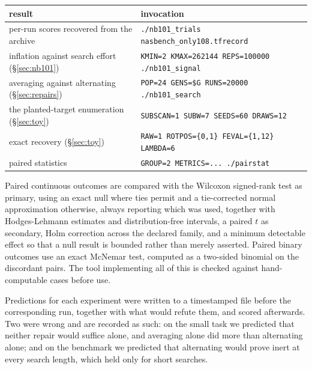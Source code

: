 \documentclass[11pt]{article}
\begin{document}
\begin{center}
\begin{tabular}{ll}
\toprule
result & invocation \\
\midrule
per-run scores recovered from the archive & \texttt{./nb101\_trials nasbench\_only108.tfrecord} \\
inflation against search effort (\S\ref{sec:nb101}) & \texttt{KMIN=2 KMAX=262144 REPS=100000 ./nb101\_signal} \\
averaging against alternating (\S\ref{sec:repairs}) & \texttt{POP=24 GENS=\$G RUNS=20000 ./nb101\_search} \\
the planted-target enumeration (\S\ref{sec:toy}) & \texttt{SUBSCAN=1 SUBW=7 SEEDS=60 DRAWS=12} \\
exact recovery (\S\ref{sec:toy}) & \texttt{RAW=1 ROTPOS=\{0,1\} FEVAL=\{1,12\} LAMBDA=6} \\
paired statistics & \texttt{GROUP=2 METRICS=... ./pairstat} \\
\bottomrule
\end{tabular}
\end{center}

Paired continuous outcomes are compared with the Wilcoxon signed-rank test as primary, using an exact
null where ties permit and a tie-corrected normal approximation otherwise, always reporting which was
used, together with Hodges-Lehmann estimates and distribution-free intervals, a paired $t$ as secondary,
Holm correction across the declared family, and a minimum detectable effect so that a null result is
bounded rather than merely asserted. Paired binary outcomes use an exact McNemar test, computed as a
two-sided binomial on the discordant pairs. The tool implementing all of this is checked against
hand-computable cases before use.

Predictions for each experiment were written to a timestamped file before the corresponding run,
together with what would refute them, and scored afterwards. Two were wrong and are recorded as such: on
the small task we predicted that neither repair would suffice alone, and averaging alone did more than
alternating alone; and on the benchmark we predicted that alternating would prove inert at every search
length, which held only for short searches.
\end{document}
